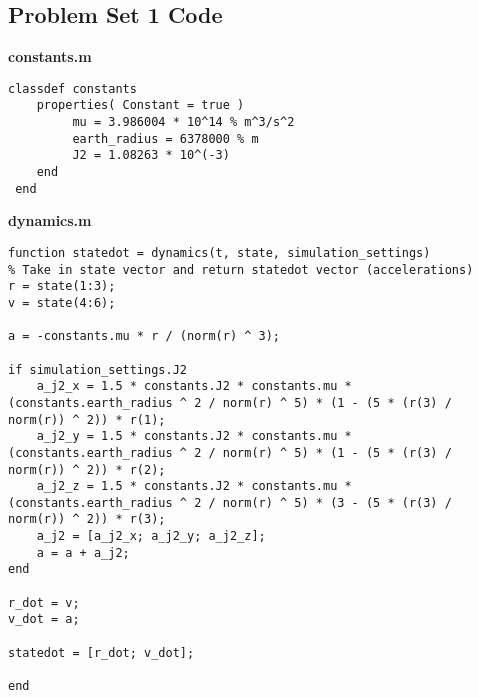\subsection{Problem Set 1 Code}

\textbf{constants.m}
\begin{lstlisting}
classdef constants
    properties( Constant = true )
         mu = 3.986004 * 10^14 % m^3/s^2
         earth_radius = 6378000 % m
         J2 = 1.08263 * 10^(-3)
    end
 end
\end{lstlisting}

\textbf{dynamics.m}
\begin{lstlisting}
function statedot = dynamics(t, state, simulation_settings)
% Take in state vector and return statedot vector (accelerations)
r = state(1:3);
v = state(4:6);

a = -constants.mu * r / (norm(r) ^ 3);

if simulation_settings.J2
    a_j2_x = 1.5 * constants.J2 * constants.mu * (constants.earth_radius ^ 2 / norm(r) ^ 5) * (1 - (5 * (r(3) / norm(r)) ^ 2)) * r(1);
    a_j2_y = 1.5 * constants.J2 * constants.mu * (constants.earth_radius ^ 2 / norm(r) ^ 5) * (1 - (5 * (r(3) / norm(r)) ^ 2)) * r(2);
    a_j2_z = 1.5 * constants.J2 * constants.mu * (constants.earth_radius ^ 2 / norm(r) ^ 5) * (3 - (5 * (r(3) / norm(r)) ^ 2)) * r(3);
    a_j2 = [a_j2_x; a_j2_y; a_j2_z];
    a = a + a_j2;
end

r_dot = v;
v_dot = a;

statedot = [r_dot; v_dot];

end
\end{lstlisting}

